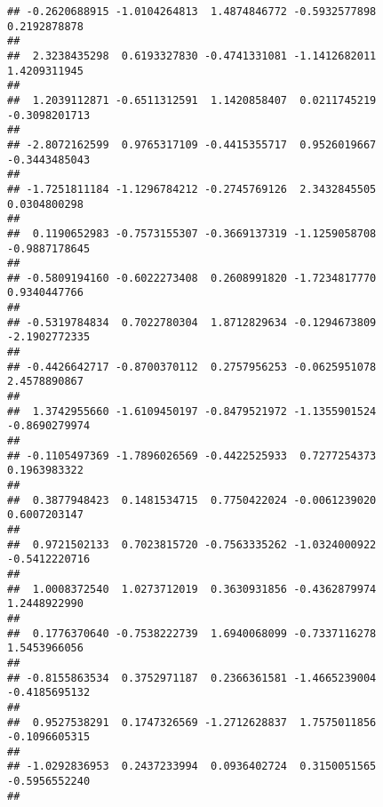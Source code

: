 \documentclass[]{article}
\begin{document}
\begin{verbatim}
## -0.2620688915 -1.0104264813  1.4874846772 -0.5932577898  0.2192878878 
##                                                                       
##  2.3238435298  0.6193327830 -0.4741331081 -1.1412682011  1.4209311945 
##                                                                       
##  1.2039112871 -0.6511312591  1.1420858407  0.0211745219 -0.3098201713 
##                                                                       
## -2.8072162599  0.9765317109 -0.4415355717  0.9526019667 -0.3443485043 
##                                                                       
## -1.7251811184 -1.1296784212 -0.2745769126  2.3432845505  0.0304800298 
##                                                                       
##  0.1190652983 -0.7573155307 -0.3669137319 -1.1259058708 -0.9887178645 
##                                                                       
## -0.5809194160 -0.6022273408  0.2608991820 -1.7234817770  0.9340447766 
##                                                                       
## -0.5319784834  0.7022780304  1.8712829634 -0.1294673809 -2.1902772335 
##                                                                       
## -0.4426642717 -0.8700370112  0.2757956253 -0.0625951078  2.4578890867 
##                                                                       
##  1.3742955660 -1.6109450197 -0.8479521972 -1.1355901524 -0.8690279974 
##                                                                       
## -0.1105497369 -1.7896026569 -0.4422525933  0.7277254373  0.1963983322 
##                                                                       
##  0.3877948423  0.1481534715  0.7750422024 -0.0061239020  0.6007203147 
##                                                                       
##  0.9721502133  0.7023815720 -0.7563335262 -1.0324000922 -0.5412220716 
##                                                                       
##  1.0008372540  1.0273712019  0.3630931856 -0.4362879974  1.2448922990 
##                                                                       
##  0.1776370640 -0.7538222739  1.6940068099 -0.7337116278  1.5453966056 
##                                                                       
## -0.8155863534  0.3752971187  0.2366361581 -1.4665239004 -0.4185695132 
##                                                                       
##  0.9527538291  0.1747326569 -1.2712628837  1.7575011856 -0.1096605315 
##                                                                       
## -1.0292836953  0.2437233994  0.0936402724  0.3150051565 -0.5956552240 
##                                                                       

\end{verbatim}
\end{document}
